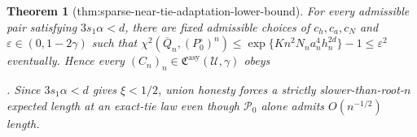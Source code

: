\documentclass{article}
\newtheorem{theorem}{Theorem}
\begin{document}
\begin{theorem}[thm:sparse-near-tie-adaptation-lower-bound]\label{thm:sparse-near-tie-adaptation-lower-bound}
For every admissible pair satisfying \(3s_1\alpha<d\), there are fixed admissible choices of \(c_h,c_a,c_N\) and \(\varepsilon\in(0,1-2\gamma)\) such that \(\chi^2(\overline Q_n,(P_0^\circ)^n)\le\exp\{K n^2N_na_n^4h_n^{2d}\}-1\le\varepsilon^2\) eventually.  Hence every \((C_n)_n\in\mathfrak C^{\mathrm{asy}}(\mathcal U,\gamma)\) obeys \par\noindent {}\par\noindent.  Since \(3s_1\alpha<d\) gives \(\xi<1/2\), union honesty forces a strictly slower-than-root-\(n\) expected length at an exact-tie law even though \(\mathcal P_0\) alone admits \(O(n^{-1/2})\) length.
\end{theorem}
\end{document}
